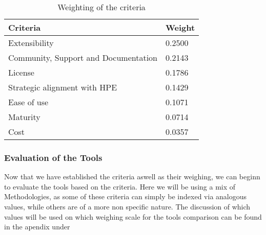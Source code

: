 \begin{table}[htb]
    \centering
    \begin{tabular}{|l|l|} \hline
        \textbf{Criteria}                       & \textbf{Weight}       \\ \hline
        Extensibility                           &  0.2500               \\ \hline
        Community, Support and  Documentation   &  0.2143               \\ \hline
        License                                 &  0.1786               \\ \hline
        Strategic alignment with \ac{HPE}       &  0.1429               \\ \hline
        Ease of use                             &  0.1071               \\ \hline
        Maturity                                &  0.0714               \\ \hline
        Cost                                    &  0.0357               \\ \hline

    \end{tabular}
    \caption{Weighting of the criteria}
    \label{tab:weighting_of_the_criteria}
\end{table}

\subsubsection{Evaluation of the Tools}

Now that we have established the criteria aswell as their weighing, we can beginn to evaluate the tools based on the criteria.
Here we will be using a mix of Methodologies, as some of these criteria can simply be indexed via analogous values, while others are of a more non specific nature.
The discussion of which values will be used on which weighing scale for the tools comparison can be found in the apendix under 


